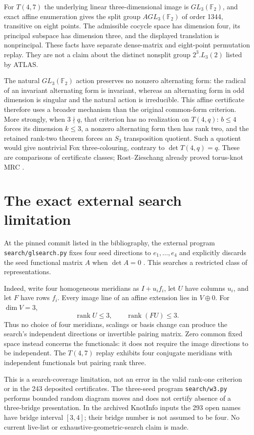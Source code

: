 \documentclass[11pt]{article}
\newcommand{\F}{\mathbb F}
\newcommand{\rank}{\operatorname{rank}}
\begin{document}
For $T(4,7)$ the underlying linear three-dimensional image is
$GL_3(\F_2)$, and exact affine enumeration gives the split group
$AGL_3(\F_2)$ of order 1344, transitive on eight points. The
admissible cocycle space has dimension four, its principal subspace
has dimension three, and the displayed translation is nonprincipal.
These facts have separate dense-matrix and eight-point permutation
replay. They are not a claim about the distinct nonsplit group
$2^3.L_3(2)$ listed by ATLAS.

The natural $GL_3(\F_2)$ action preserves no nonzero alternating
form: the radical of an invariant alternating form is invariant,
whereas an alternating form in odd dimension is singular and the
natural action is irreducible. This affine certificate therefore
uses a broader mechanism than the original common-form criterion.
More strongly, when $3\nmid q$, that criterion has no realization
on $T(4,q)$: $b\le4$ forces its dimension $k\le3$, a nonzero
alternating form then has rank two, and the retained rank-two
theorem forces an $S_3$ transposition quotient. Such a quotient
would give nontrivial Fox three-colouring, contrary to
$\det T(4,q)=q$. These are comparisons of certificate classes;
Rost--Zieschang already proved torus-knot MRC \cite{rz}.

\section{The exact external search limitation}

At the pinned commit listed in the bibliography, the external
program \texttt{search/glsearch.py} fixes four seed
directions to $e_1,\ldots,e_4$ and explicitly discards the seed
functional matrix $A$ when $\det A=0$ \cite{search}.
This searches a restricted class of representations.

Indeed, write four homogeneous meridians as $I+u_i f_i$, let
$U$ have columns $u_i$, and let $F$ have rows $f_i$. Every image
line of an affine extension lies in $V\oplus0$. For $\dim V=3$,
\[
 \rank U\le3,\qquad \rank(FU)\le3.
\]
Thus no choice of four meridians, scalings or basis change can
produce the search's independent directions or invertible pairing
matrix. Zero common fixed space instead concerns the functionals:
it does not require the image directions to be independent.
The $T(4,7)$ replay exhibits four conjugate meridians with
independent functionals but pairing rank three.

This is a search-coverage limitation, not an error in the valid
rank-one criterion or in the 243 deposited certificates. The
three-seed program \texttt{search/w3.py} performs bounded random
diagram moves and does not certify absence of a three-bridge
presentation. In the archived KnotInfo inputs the 293 open names
have bridge interval $[3,4]$; their bridge number is not assumed
to be four. No current live-list or exhaustive-geometric-search
claim is made.
\end{document}

